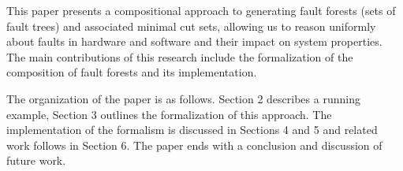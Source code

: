 
This paper presents a compositional approach to generating fault forests (sets of fault trees) and associated minimal cut sets, allowing us to reason uniformly about faults in hardware and software and their impact on system properties. The main contributions of this research include the formalization of the composition of fault forests and its implementation.


The organization of the paper is as follows.  Section 2 describes a running example, Section 3 outlines the formalization of this approach. The implementation of the formalism is discussed in Sections 4 and 5 and related work follows in Section 6. The paper ends with a conclusion and discussion of future work.
